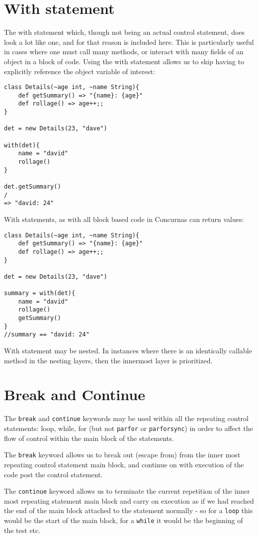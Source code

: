 \documentclass[conc-doc]{subfiles}
\begin{document}
\section{With statement}
The with statement which, though not being an actual control statement, does look a lot like one, and for that reason is included here. This is particularly useful in cases where one must call many methods, or interact with many fields of an object  in a block of code. Using the with statement allows us to skip having to explicitly reference the object variable of interest:
\begin{lstlisting}
class Details(~age int, ~name String){
	def getSummary() => "{name}: {age}"
	def rollage() => age++;;
}

det = new Details(23, "dave")

with(det){
	name = "david"
	rollage()
}

det.getSummary()
/
=> "david: 24"
\end{lstlisting}

With statements, as with all block based code in Concurnas can return values:

\begin{lstlisting}
class Details(~age int, ~name String){
	def getSummary() => "{name}: {age}"
	def rollage() => age++;;
}

det = new Details(23, "dave")

summary = with(det){
	name = "david"
	rollage()
	getSummary()
}
//summary == "david: 24"
\end{lstlisting}

With statement may be nested. In instances where there is an identically callable method in the nesting layers, then the innermost layer is prioritized. 

\section{Break and Continue}
The \lstinline{break} and \lstinline{continue} keywords may be used within all the repeating control statements: loop, while, for (but not \lstinline{parfor} or \lstinline{parforsync}) in order to affect the flow of control within the main block of the statements.

The \lstinline{break} keyword allows us to break out (escape from) from the inner most repeating control statement main block, and continue on with execution of the code post the control statement.

The \lstinline{continue} keyword allows us to terminate the current repetition of the inner most repeating statement main block and carry on execution as if we had reached the end of the main block attached to the statement normally - so for a \lstinline{loop} this would be the start of the main block, for a \lstinline{while} it would be the beginning of the test etc.
\end{document}
